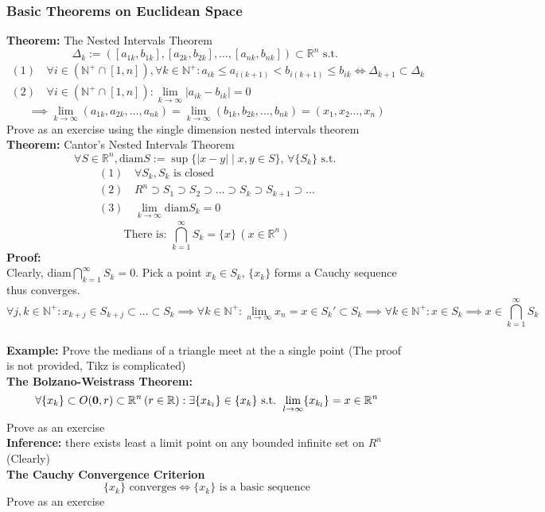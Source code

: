 \documentclass{article}
\newcommand{\R}{\mathbb{R}}
\newcommand{\N}{\mathbb{N}}
\newcommand{\st}{\mbox{ s.t. }}
\newcommand{\diam}{\mbox{diam}}
\newcommand{\0}{{\bf{0}}}
\begin{document}
\subsubsection{Basic Theorems on Euclidean Space}
\textbf{Theorem:} The Nested Intervals Theorem
$$\Delta_k:=([a_{1k},b_{1k}],[a_{2k},b_{2k}],\dots,[a_{nk},b_{nk}])\subset\R^n\st$$
\begin{equation}
\begin{split}
    (1)\,&\forall i\in(\N^+\cap[1,n]),\forall k\in\N^+:a_{ik}\le a_{i(k+1)}<b_{i(k+1)}\le b_{ik}\iff\Delta_{k+1}\subset\Delta_k\\
    (2)\,&\forall i\in(\N^+\cap[1,n]):\lim_{k\to\infty}|a_{ik}-b_{ik}|=0
\end{split}
\end{equation}
$$\implies\lim_{k\to\infty}(a_{1k},a_{2k},\dots,a_{nk})=\lim_{k\to\infty}(b_{1k},b_{2k},\dots,b_{nk})=(x_1,x_2\dots,x_n)$$
\null\hfill{Prove as an exercise using the single dimension nested intervals theorem}\\
\textbf{Theorem:} Cantor's Nested Intervals Theorem
$$\forall S\in\R^n,\diam S:=\sup\{|x-y|\mid x,y\in S\},\,\forall\{S_k\}\st$$
\begin{equation}
\begin{split}
    (1)\,&\forall S_k, S_k\mbox{ is closed}\\
    (2)\,&R^n\supset S_1\supset S_2\supset\dots\supset S_k\supset S_{k+1}\supset\dots\\
    (3)\,&\lim_{k\to\infty}\diam S_k=0
\end{split}
\end{equation}
$$\mbox{There is: }\bigcap_{k=1}^\infty S_k=\{x\}\,(x\in\R^n)$$
\textbf{Proof:}\\
Clearly, diam$\bigcap\limits_{k=1}^\infty S_k=0$. Pick a point $x_k\in S_k,\,\{x_k\}$ forms a Cauchy sequence thus converges.
$$\forall j,k\in\N^+:x_{k+j}\in S_{k+j}\subset\dots\subset S_k\implies\forall k\in\N^+:\lim_{n\to\infty}x_n=x\in S_k'\subset S_k\implies\forall k\in\N^+:x\in S_k\implies x\in\bigcap_{k=1}^\infty S_k$$\\
\textbf{Example:} Prove the medians of a triangle meet at the a single point (The proof is not provided, Tikz is complicated)\\
\textbf{The Bolzano-Weistrass Theorem:}
$$\forall\{x_k\}\subset O(\0,r)\subset\R^n\,(r\in\R):\exists\{x_{k_l}\}\in\{x_k\}\st\lim_{l\to\infty}\{x_{k_l}\}=x\in\R^n$$
\null\hfill{Prove as an exercise}\\
\textbf{Inference:} there exists least a limit point on any bounded infinite set on $R^n$ (Clearly)\\
\textbf{The Cauchy Convergence Criterion}
$$\{x_k\}\mbox{ converges}\iff\{x_k\}\mbox{ is a basic sequence}$$
\null\hfill{Prove as an exercise}
\end{document}
